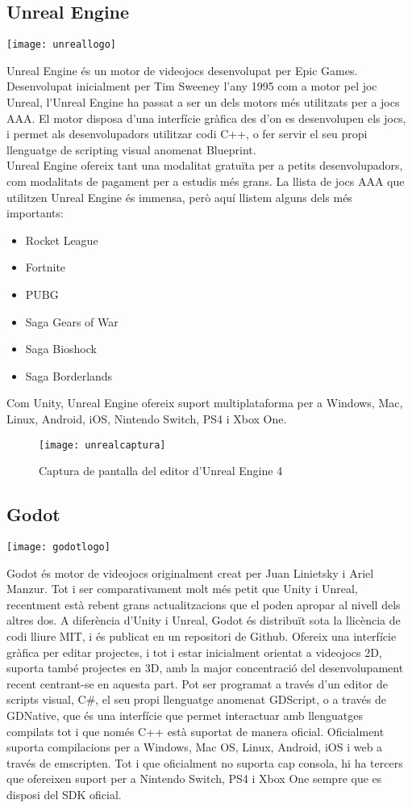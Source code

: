 \subsection{Unreal Engine}
\begin{center}
  \texttt{[image: unreallogo]}
\end{center}
Unreal Engine és un motor de videojocs desenvolupat per Epic Games. Desenvolupat inicialment per Tim Sweeney l'any 1995 com a motor pel joc Unreal, l'Unreal Engine ha passat a ser un dels motors més utilitzats per a jocs AAA.
El motor disposa d'una interfície gràfica des d'on es desenvolupen els jocs, i permet als desenvolupadors utilitzar codi C++, o fer servir el seu propi llenguatge de scripting visual anomenat Blueprint.
\\
Unreal Engine ofereix tant una modalitat gratuïta per a petits desenvolupadors, com modalitats de pagament per a estudis més grans.
La llista de jocs AAA que utilitzen Unreal Engine és immensa, però aquí llistem alguns dels més importants:
\begin{itemize}
  \item Rocket League
  \item Fortnite
  \item PUBG
  \item Saga Gears of War
  \item Saga Bioshock
  \item Saga Borderlands
\end{itemize}

Com Unity, Unreal Engine ofereix suport multiplataforma per a Windows, Mac, Linux, Android, iOS, Nintendo Switch, PS4 i Xbox One.
\begin{figure}[h]
  \texttt{[image: unrealcaptura]}
  \caption{Captura de pantalla del editor d'Unreal Engine 4}
\end{figure}
\subsection{Godot}
\begin{center}
  \texttt{[image: godotlogo]}
\end{center}
Godot és motor de videojocs originalment creat per Juan Linietsky i Ariel Manzur. Tot i ser comparativament molt més petit que Unity i Unreal, recentment està rebent grans actualitzacions que el poden apropar al nivell dels altres dos.
A diferència d'Unity i Unreal, Godot és distribuït sota la llicència de codi lliure MIT, i és publicat en un repositori de Github.
Ofereix una interfície gràfica per editar projectes, i tot i estar inicialment orientat a videojocs 2D, suporta també projectes en 3D, amb la major concentració del desenvolupament recent centrant-se en aquesta part.
Pot ser programat a través d'un editor de scripts visual, C\#, el seu propi llenguatge anomenat GDScript, o a través de GDNative, que és una interfície que permet interactuar amb llenguatges compilats tot i que només C++ està suportat de manera oficial.
Oficialment suporta compilacions per a Windows, Mac OS, Linux, Android, iOS i web a través de emscripten. Tot i que oficialment no suporta cap consola, hi ha tercers que ofereixen suport per a Nintendo Switch, PS4 i Xbox One sempre que es disposi del SDK oficial.
